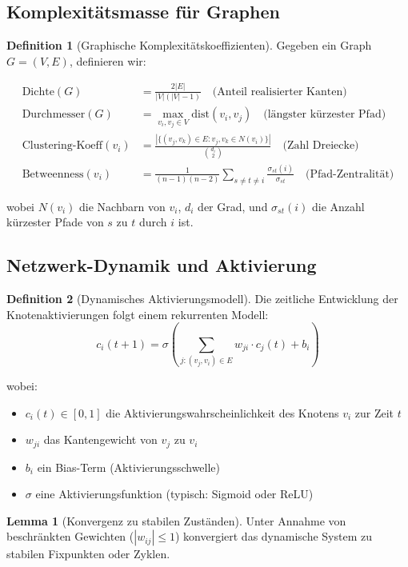 \documentclass[a4paper,12pt]{article}
\theoremstyle{definition}
\newtheorem{definition}{Definition}
\newtheorem{lemma}{Lemma}
\begin{document}
\subsection{Komplexitätsmasse für Graphen}

\begin{definition}[Graphische Komplexitätskoeffizienten]
Gegeben ein Graph $G = (V, E)$, definieren wir:

\begin{align}
\text{Dichte}(G) &= \frac{2|E|}{|V|(|V|-1)} \quad \text{(Anteil realisierter Kanten)} \\
\text{Durchmesser}(G) &= \max_{v_i, v_j \in V} \text{dist}(v_i, v_j) \quad \text{(längster kürzester Pfad)} \\
\text{Clustering-Koeff}(v_i) &= \frac{|\{(v_j, v_k) \in E : v_j, v_k \in N(v_i)\}|}{\binom{d_i}{2}} \quad \text{(Zahl Dreiecke)} \\
\text{Betweenness}(v_i) &= \frac{1}{(n-1)(n-2)} \sum_{s \neq t \neq i} \frac{\sigma_{st}(i)}{\sigma_{st}} \quad \text{(Pfad-Zentralität)}
\end{align}

wobei $N(v_i)$ die Nachbarn von $v_i$, $d_i$ der Grad, und $\sigma_{st}(i)$ die Anzahl kürzester Pfade von $s$ zu $t$ durch $i$ ist.
\end{definition}

\subsection{Netzwerk-Dynamik und Aktivierung}

\begin{definition}[Dynamisches Aktivierungsmodell]
Die zeitliche Entwicklung der Knotenaktivierungen folgt einem rekurrenten Modell:
\[
c_i(t+1) = \sigma\left( \sum_{j: (v_j, v_i) \in E} w_{ji} \cdot c_j(t) + b_i \right)
\]

wobei:
\begin{itemize}
	\item $c_i(t) \in [0,1]$ die Aktivierungswahrscheinlichkeit des Knotens $v_i$ zur Zeit $t$
	\item $w_{ji}$ das Kantengewicht von $v_j$ zu $v_i$
	\item $b_i$ ein Bias-Term (Aktivierungsschwelle)
	\item $\sigma$ eine Aktivierungsfunktion (typisch: Sigmoid oder ReLU)
\end{itemize}
\end{definition}

\begin{lemma}[Konvergenz zu stabilen Zuständen]
Unter Annahme von beschränkten Gewichten ($|w_{ij}| \leq 1$) konvergiert das dynamische System zu stabilen Fixpunkten oder Zyklen.
\end{lemma}
\end{document}
